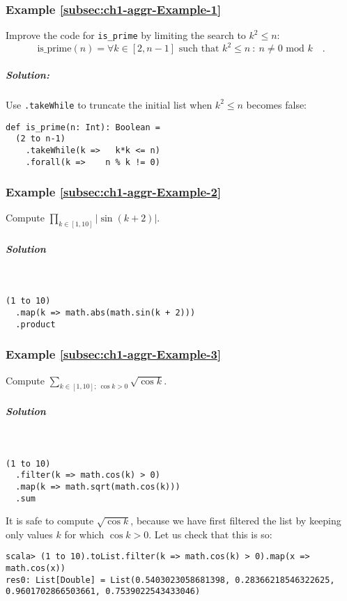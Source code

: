 \subsubsection{Example \label{subsec:ch1-aggr-Example-1}\ref{subsec:ch1-aggr-Example-1}}

Improve the code for \lstinline!is_prime! by limiting the search
to $k^{2}\leq n$:
\[
\text{is\_prime}\left(n\right)=\forall k\in\left[2,n-1\right]\text{ such that }k^{2}\leq n\ :\ n\neq0\text{ mod }k\quad.
\]


\subparagraph{Solution:}

Use \lstinline!.takeWhile! to truncate the initial list when $k^{2}\leq n$
becomes false:
\begin{lstlisting}
def is_prime(n: Int): Boolean =
  (2 to n-1)
    .takeWhile(k =>   k*k <= n)
    .forall(k =>    n % k != 0)
\end{lstlisting}


\subsubsection{Example \label{subsec:ch1-aggr-Example-2}\ref{subsec:ch1-aggr-Example-2}}

Compute $\prod_{k\in\left[1,10\right]}\left|\sin\left(k+2\right)\right|$.

\subparagraph{Solution}

~
\begin{lstlisting}
(1 to 10)
  .map(k => math.abs(math.sin(k + 2)))
  .product
\end{lstlisting}


\subsubsection{Example \label{subsec:ch1-aggr-Example-3}\ref{subsec:ch1-aggr-Example-3}}

Compute $\sum_{k\in[1,10];~\cos k>0}\sqrt{\cos k}$.

\subparagraph{Solution}

~

\begin{lstlisting}
(1 to 10)
  .filter(k => math.cos(k) > 0)
  .map(k => math.sqrt(math.cos(k)))
  .sum
\end{lstlisting}
It is safe to compute $\sqrt{\cos k}$, because we have first filtered
the list by keeping only values $k$ for which $\cos k>0$. Let us
check that this is so:
\begin{lstlisting}
scala> (1 to 10).toList.filter(k => math.cos(k) > 0).map(x => math.cos(x))
res0: List[Double] = List(0.5403023058681398, 0.28366218546322625, 0.9601702866503661, 0.7539022543433046)
\end{lstlisting}


